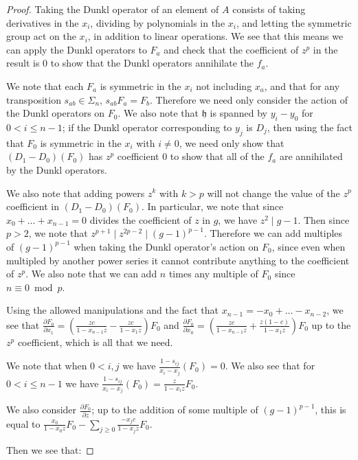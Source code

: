 \documentclass{article}
\numberwithin{equation}{section}
\begin{document}
\begin{proof}
Taking the Dunkl operator of an element of $A$ consists of taking derivatives in the $x_i$, dividing by polynomials in the $x_i$, and letting the symmetric group act on the $x_i$, in addition to linear operations. We see that this means we can apply the Dunkl operators to $F_a$ and check that the coefficient of $z^p$ in the result is $0$ to show that the Dunkl operators annihilate the $f_a$.

We note that each $F_a$ is symmetric in the $x_i$ not including $x_a$, and that for any transposition $s_{ab} \in \Sigma_n$, $s_{ab}F_a=F_b$. Therefore we need only consider the action of the Dunkl operators on $F_0$. We also note that $\mathfrak{h}$ is spanned by $y_i-y_0$ for $0 < i \le n-1$; if the Dunkl operator corresponding to $y_j$ is $D_j$, then using the fact that $F_0$ is symmetric in the $x_i$ with $i \ne 0$, we need only show that $(D_1-D_0)(F_0)$ has $z^p$ coefficient $0$ to show that all of the $f_a$ are annihilated by the Dunkl operators. 

We also note that adding powers $z^k$ with $k > p$ will not change the value of the $z^p$ coefficient in $(D_1-D_0)(F_0)$. In particular, we note that since $x_0+\dots+x_{n-1}=0$ divides the coefficient of $z$ in $g$, we have $z^2 \mid g-1$. Then since $p>2$, we note that $z^{p+1} \mid z^{2p-2} \mid (g-1)^{p-1}$. Therefore we can add multiples of $(g-1)^{p-1}$ when taking the Dunkl operator's action on $F_0$, since even when multipled by another power series it cannot contribute anything to the coefficient of $z^p$. We also note that we can add $n$ times any multiple of $F_0$ since $n \equiv 0 \bmod p$. 

Using the allowed manipulations and the fact that $x_{n-1}=-x_0+\dots-x_{n-2}$, we see that $\frac{\partial F_0}{\partial x_1}=\left(\frac{zc}{1-x_{n-1}z}-\frac{zc}{1-x_1z}\right)F_0$ and $\frac{\partial F_0}{\partial x_0}=\left(\frac{zc}{1-x_{n-1}z}+\frac{z(1-c)}{1-x_1z}\right)F_0$ up to the $z^p$ coefficient, which is all that we need.

We note that when $0 < i,j$ we have $\frac{1-s_{ij}}{x_i-x_j}\left(F_0\right)=0$. We also see that for $0 < i \le n-1$ we have $\frac{1-s_{ij}}{x_i-x_j}\left(F_0\right)=\frac{z}{1-x_iz}F_0$. 

We also consider $\frac{\partial F_0}{\partial z}$; up to the addition of some multiple of $(g-1)^{p-1}$, this is equal to $\frac{x_0}{1-x_0z}F_0-\sum_{j \ge 0} \frac{-x_jc}{1-x_jz}F_0$. 

Then we see that:


\end{proof}
\end{document}

